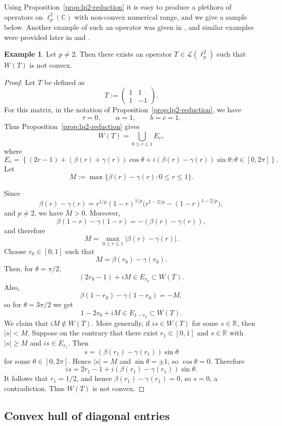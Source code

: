 \documentclass[11pt]{amsart}
\numberwithin{equation}{section}
\theoremstyle{definition}
\newtheorem{example}[theorem]{Example}
\theoremstyle{remark}
\newcommand{\R}{\mathbb{R}}
\newcommand{\C}{\mathbb{C}}
\begin{document}
Using Proposition~\ref{prop:lp2-reduction} it is easy to produce a plethora of operators on $\ell_p^2(\C)$ with non-convex numerical range, and we give a sample below. Another example
of such an operator was given in \cite[Section 11]{BD1}, and similar examples were provided later in \cite[Example 11.5]{AppDV} and \cite{Mandal}.

\begin{example}\label{ex:lp2-nonconvex}
Let $p\neq 2$. Then there exists an operator $T\in \mathcal L(\ell_p^2)$ such that $W(T)$ is not convex.
\end{example}

\begin{proof}
Let $T$ be defined as 
\[
T:=\begin{pmatrix}1&1\\1&-1\end{pmatrix}.
\]
For this matrix, in the notation of Proposition~\ref{prop:lp2-reduction}, we have
\[
        \tau=0,\qquad \alpha=1,\qquad b=c=1.
\]
Thus Proposition~\ref{prop:lp2-reduction} gives
\[
        W(T)=\bigcup_{0\le r\le1}E_r,
\]
where
\[
        E_r=
        \left\{
        (2r-1)+(\beta(r)+\gamma(r))\cos\theta
        +i(\beta(r)-\gamma(r))\sin\theta:
        \theta\in [0,2\pi]
        \right\}.
\]
Let
\[
M:=\max\{\beta(r)-\gamma(r):0\le r\le 1\}.
\]

Since
\[
\beta(r)-\gamma(r)
=
r^{1/p}(1-r)^{1/p}
\bigl(r^{1-2/p}-(1-r)^{1-2/p}\bigr),
\]
and \(p\ne 2\), we have \(M>0\). Moreover,
\[
        \beta(1-r)-\gamma(1-r)=-(\beta(r)-\gamma(r)),
\]
and therefore
\[
        M=\max_{0\le r\le 1}|\beta(r)-\gamma(r)|.
\]
Choose \(r_0\in[0,1]\) such that
\[
        M=\beta(r_0)-\gamma(r_0).
\]
Then, for $\theta=\pi/2$,
\[
(2r_0-1)+iM\in E_{r_0}\subset W(T).
\]
Also,
\[
\beta(1-r_0)-\gamma(1-r_0)=-M,
\]
so for $\theta=3\pi/2$ we get
\[
1-2r_0+iM\in E_{1-r_0}\subset W(T).
\]
We claim that $iM\notin W(T)$. More generally, if $is\in W(T)$ for some $s\in\R$, then $|s|<M$.
Suppose on the contrary that there exist $r_1\in[0,1]$ and $s\in\R$ with $|s|\ge M$ and $is\in E_{r_1}$. Then
\[
s=(\beta(r_1)-\gamma(r_1))\sin\theta
\]
for some $\theta\in[0,2\pi]$. Hence $|s|=M$ and $\sin\theta=\pm1$, so $\cos\theta=0$. Therefore
\[
is=2r_1-1+i(\beta(r_1)-\gamma(r_1))\sin\theta.
\]
It follows that $r_1=1/2$, and hence $\beta(r_1)-\gamma(r_1)=0$, so $s=0$, a contradiction.
Thus $W(T)$ is not convex.
\end{proof}



\subsection{Convex hull of diagonal entries}
\leavevmode\par
\end{document}
